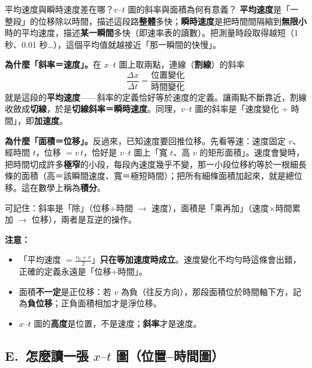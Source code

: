 \documentclass[11pt]{article}
\begin{document}
\begin{補充框}{平均速度與瞬時速度差在哪？$v\text{–}t$ 圖的斜率與面積為何有意義？}
\textbf{平均速度}是「一整段」的位移除以時間，描述這段路\textbf{整體}多快；\textbf{瞬時速度}是把時間間隔縮到\textbf{無限小}時的平均速度，描述\textbf{某一瞬間}多快（即速率表的讀數）。把測量時段取得越短（1 秒、0.01 秒\dots），這個平均值就越接近「那一瞬間的快慢」。

\textbf{為什麼「斜率＝速度」。}在 $x\text{–}t$ 圖上取兩點，連線（\textbf{割線}）的斜率
$$\frac{\Delta x}{\Delta t} = \frac{\text{位置變化}}{\text{時間變化}}$$
就是這段的\textbf{平均速度}——斜率的定義恰好等於速度的定義。讓兩點不斷靠近，割線收斂成\textbf{切線}，於是\textbf{切線斜率＝瞬時速度}。同理，$v\text{–}t$ 圖的斜率是「速度變化 ÷ 時間」，即\textbf{加速度}。

\textbf{為什麼「面積＝位移」。}反過來，已知速度要回推位移。先看等速：速度固定 $v$、經時間 $t$，位移 $=v\,t$，恰好是 $v\text{–}t$ 圖上「寬 $t$、高 $v$ 的矩形面積」。速度會變時，把時間切成許多\textbf{極窄}的小段，每段內速度幾乎不變，那一小段位移約等於一根細長條的面積（高＝該瞬間速度、寬＝極短時間）；把所有細條面積加起來，就是總位移。這在數學上稱為\textbf{積分}。

可記住：斜率是「除」（位移÷時間 $\rightarrow$ 速度），面積是「乘再加」（速度×時間累加 $\rightarrow$ 位移），兩者是互逆的操作。

\textbf{注意：}
\begin{itemize}\setlength{\itemsep}{1pt}
\item 「平均速度 $=\tfrac{v_0+v}{2}$」\textbf{只在等加速度時成立}。速度變化不均勻時這條會出錯，正確的定義永遠是「位移÷時間」。
\item 面積\textbf{不一定}是正位移：若 $v$ 為負（往反方向），那段面積位於時間軸下方，記為\textbf{負位移}；正負面積相加才是淨位移。
\item $x\text{–}t$ 圖的\textbf{高度}是位置，不是速度；\textbf{斜率}才是速度。
\end{itemize}
\end{補充框}


\subsection*{\sffamily E.\ 怎麼讀一張 $x\text{–}t$ 圖（位置–時間圖）}
\end{document}
